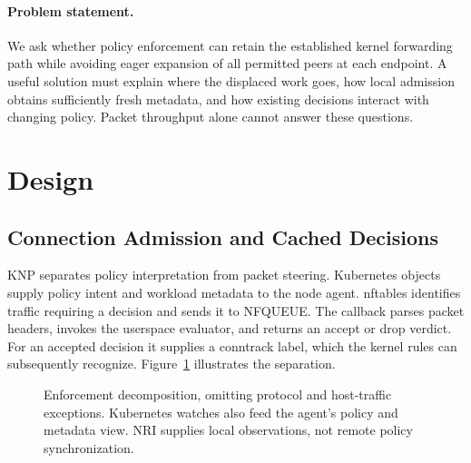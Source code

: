 \documentclass[letterpaper,twocolumn,10pt]{article}
\newcommand{\sys}{\textsc{KNP}}
\begin{document}
\paragraph{Problem statement.}
We ask whether policy enforcement can retain the established kernel
forwarding path while avoiding eager expansion of all permitted peers
at each endpoint. A useful solution must explain where the displaced work
goes, how local admission obtains sufficiently fresh metadata, and how
existing decisions interact with changing policy. Packet throughput alone
cannot answer these questions.

\section{Design}
\label{sec:design}
\subsection{Connection Admission and Cached Decisions}
\sys{} separates policy interpretation from packet steering. Kubernetes
objects supply policy intent and workload metadata to the node agent.
nftables identifies traffic requiring a decision and sends it to NFQUEUE.
The callback parses packet headers, invokes the userspace evaluator, and
returns an accept or drop verdict. For an accepted decision it supplies a
conntrack label, which the kernel rules can subsequently recognize.
Figure~\ref{fig:architecture} illustrates the separation.

\begin{figure}[t]
\centering
{}
\caption{Enforcement decomposition, omitting protocol and host-traffic
exceptions. Kubernetes watches also feed the agent's policy and metadata
view. NRI supplies local observations, not remote policy synchronization.}
\label{fig:architecture}
\end{figure}
\end{document}
